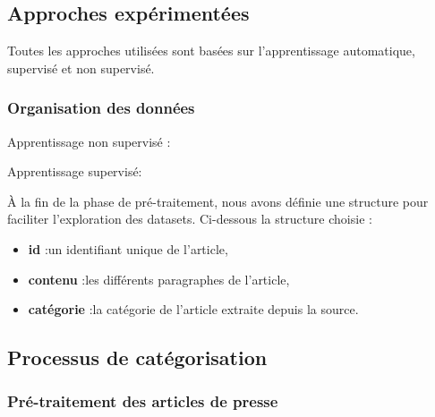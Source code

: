    \subsection{Approches expérimentées\label{approches}}
    Toutes les approches utilisées sont basées sur l'apprentissage automatique, supervisé et non supervisé. 
     
     \subsubsection{Organisation des données}
      Apprentissage non supervisé :
     
     
     
       Apprentissage supervisé:
     
      À la fin de la phase de pré-traitement, nous avons définie une structure pour faciliter l'exploration des datasets. Ci-dessous la structure choisie :
     \begin{itemize}
        \item{\textbf{id} :}un identifiant unique de l'article,
        \item{\textbf{contenu} :}les différents paragraphes de l'article,
        \item{\textbf{catégorie} :}la catégorie de l'article extraite depuis la source.
     \end{itemize}
      
        \subsection{Processus de catégorisation}
         
            \subsubsection{Pré-traitement des articles de presse}
           
